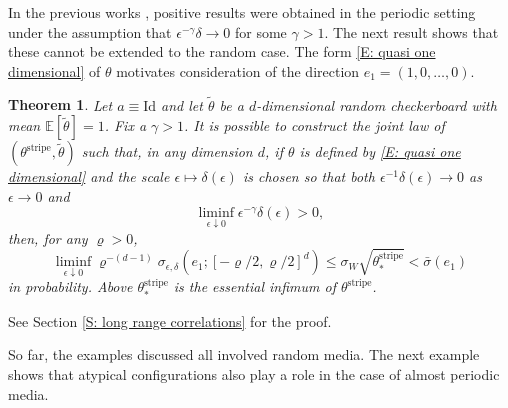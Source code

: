 \documentclass[12pt]{amsart}
\newtheorem{theorem}{Theorem}
\begin{document}
In the previous works \cite{ansini_braides_chiado-piat,hagerty}, positive results were obtained in the periodic setting under the assumption that $\epsilon^{- \gamma } \delta \to 0$ for some $\gamma > 1$.  The next result shows that these cannot be extended to the random case.  The form \eqref{E: quasi one dimensional} of $\theta$ motivates consideration of the direction $e_{1} = (1,0,\dots,0)$.

	\begin{theorem} \label{T: algebraic correlation counterexample}Let $a \equiv \text{Id}$ and let $\tilde{\theta}$ be a $d$-dimensional random checkerboard with mean $\mathbb{E}[\tilde{\theta}] = 1$.  Fix a $\gamma > 1$.  It is possible to construct the joint law of $(\theta^{\text{stripe}},\tilde{\theta})$ such that,  in any dimension $d$, if $\theta$ is defined by \eqref{E: quasi one dimensional} and the scale $\epsilon \mapsto \delta(\epsilon)$ is chosen so that both $\epsilon^{-1} \delta(\epsilon) \to 0$ as $\epsilon \to 0$ and
		\begin{equation*}
			\liminf_{\epsilon \downarrow 0} \epsilon^{-\gamma} \delta(\epsilon) > 0,
		\end{equation*}
	then, for any $\varrho > 0$,
		\begin{equation} \label{E: algebraic correlations lim inf}
			\liminf_{ \epsilon \downarrow 0 } \varrho^{-(d-1)} \sigma_{\epsilon,\delta}(e_{1} ; [-\varrho/2,\varrho/2]^{d} )  \leq \sigma_{W} \sqrt{\theta^{\text{stripe}}_{*}}  < \bar{\sigma}(e_{1})
		\end{equation}
	in probability.  Above $\theta_{*}^{\text{stripe}}$ is the essential infimum of $\theta^{\text{stripe}}$.\end{theorem}

See Section \ref{S: long range correlations} for the proof.
		
So far, the examples discussed all involved random media.  The next example shows that atypical configurations also play a role in the case of almost periodic media.  
\end{document}
